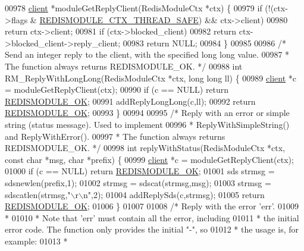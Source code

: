\begin{DoxyCode}
{{00978 \hyperlink{structclient}{client} *moduleGetReplyClient(RedisModuleCtx *ctx) \{
00979     \textcolor{keywordflow}{if} (!(ctx->flags & \hyperlink{module_8c_a884fbd2b3a1b008f1635afaeb87ca52a}{REDISMODULE\_CTX\_THREAD\_SAFE}) && ctx->client)
00980         \textcolor{keywordflow}{return} ctx->client;
00981     \textcolor{keywordflow}{if} (ctx->blocked\_client)
00982         \textcolor{keywordflow}{return} ctx->blocked\_client->reply\_client;
00983     \textcolor{keywordflow}{return} NULL;
00984 \}
00985 
00986 \textcolor{comment}{/* Send an integer reply to the client, with the specified long long value.}
00987 \textcolor{comment}{ * The function always returns REDISMODULE\_OK. */}
00988 \textcolor{keywordtype}{int} RM\_ReplyWithLongLong(RedisModuleCtx *ctx, \textcolor{keywordtype}{long} \textcolor{keywordtype}{long} ll) \{
00989     \hyperlink{structclient}{client} *c = moduleGetReplyClient(ctx);
00990     \textcolor{keywordflow}{if} (c == NULL) \textcolor{keywordflow}{return} \hyperlink{redismodule_8h_a1bc5bfd69abcd378ff52c640adc5418d}{REDISMODULE\_OK};
00991     addReplyLongLong(c,ll);
00992     \textcolor{keywordflow}{return} \hyperlink{redismodule_8h_a1bc5bfd69abcd378ff52c640adc5418d}{REDISMODULE\_OK};
00993 \}
00994 
00995 \textcolor{comment}{/* Reply with an error or simple string (status message). Used to implement}
00996 \textcolor{comment}{ * ReplyWithSimpleString() and ReplyWithError().}
00997 \textcolor{comment}{ * The function always returns REDISMODULE\_OK. */}
00998 \textcolor{keywordtype}{int} replyWithStatus(RedisModuleCtx *ctx, \textcolor{keyword}{const} \textcolor{keywordtype}{char} *msg, \textcolor{keywordtype}{char} *prefix) \{
00999     \hyperlink{structclient}{client} *c = moduleGetReplyClient(ctx);
01000     \textcolor{keywordflow}{if} (c == NULL) \textcolor{keywordflow}{return} \hyperlink{redismodule_8h_a1bc5bfd69abcd378ff52c640adc5418d}{REDISMODULE\_OK};
01001     sds strmsg = sdsnewlen(prefix,1);
01002     strmsg = sdscat(strmsg,msg);
01003     strmsg = sdscatlen(strmsg,\textcolor{stringliteral}{"\(\backslash\)r\(\backslash\)n"},2);
01004     addReplySds(c,strmsg);
01005     \textcolor{keywordflow}{return} \hyperlink{redismodule_8h_a1bc5bfd69abcd378ff52c640adc5418d}{REDISMODULE\_OK};
01006 \}
01007 
01008 \textcolor{comment}{/* Reply with the error 'err'.}
01009 \textcolor{comment}{ *}
01010 \textcolor{comment}{ * Note that 'err' must contain all the error, including}
01011 \textcolor{comment}{ * the initial error code. The function only provides the initial "-", so}
01012 \textcolor{comment}{ * the usage is, for example:}
01013 \textcolor{comment}{ *}
}}
\end{DoxyCode}
